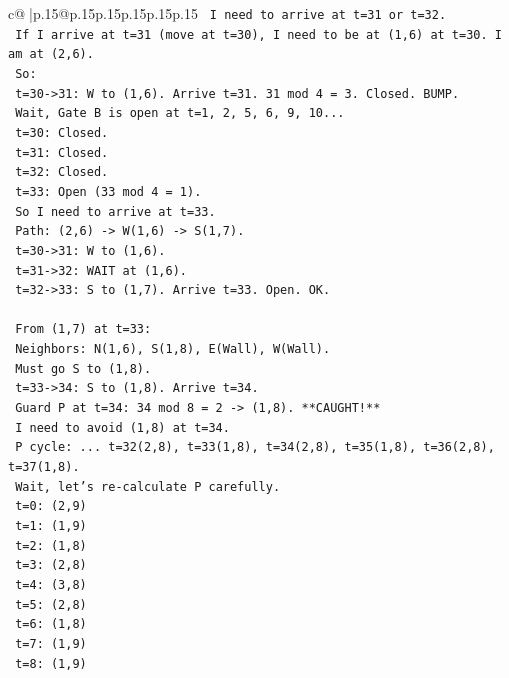 \documentclass{article}
\begin{document}
{\begin{supertabular}{c@{$\;$}|p{.15\linewidth}@{}p{.15\linewidth}p{.15\linewidth}p{.15\linewidth}p{.15\linewidth}p{.15\linewidth}}
{{{\texttt{   I need to arrive at t=31 or t=32.} \\
\texttt{   If I arrive at t=31 (move at t=30), I need to be at (1,6) at t=30. I am at (2,6).} \\
\texttt{   So:} \\
\texttt{   t=30{-}>31: W to (1,6). Arrive t=31. 31 mod 4 = 3. Closed. BUMP.} \\
\texttt{   Wait, Gate B is open at t=1, 2, 5, 6, 9, 10...} \\
\texttt{   t=30: Closed.} \\
\texttt{   t=31: Closed.} \\
\texttt{   t=32: Closed.} \\
\texttt{   t=33: Open (33 mod 4 = 1).} \\
\texttt{   So I need to arrive at t=33.} \\
\texttt{   Path: (2,6) {-}> W(1,6) {-}> S(1,7).} \\
\texttt{   t=30{-}>31: W to (1,6).} \\
\texttt{   t=31{-}>32: WAIT at (1,6).} \\
\texttt{   t=32{-}>33: S to (1,7). Arrive t=33. Open. OK.} \\
\\ 
\texttt{   From (1,7) at t=33:} \\
\texttt{   Neighbors: N(1,6), S(1,8), E(Wall), W(Wall).} \\
\texttt{   Must go S to (1,8).} \\
\texttt{   t=33{-}>34: S to (1,8). Arrive t=34.} \\
\texttt{   Guard P at t=34: 34 mod 8 = 2 {-}> (1,8). **CAUGHT!**} \\
\texttt{   I need to avoid (1,8) at t=34.} \\
\texttt{   P cycle: ... t=32(2,8), t=33(1,8), t=34(2,8), t=35(1,8), t=36(2,8), t=37(1,8).} \\
\texttt{   Wait, let's re{-}calculate P carefully.} \\
\texttt{   t=0: (2,9)} \\
\texttt{   t=1: (1,9)} \\
\texttt{   t=2: (1,8)} \\
\texttt{   t=3: (2,8)} \\
\texttt{   t=4: (3,8)} \\
\texttt{   t=5: (2,8)} \\
\texttt{   t=6: (1,8)} \\
\texttt{   t=7: (1,9)} \\
\texttt{   t=8: (1,9)} \\
}}}
\end{supertabular}}
\end{document}
